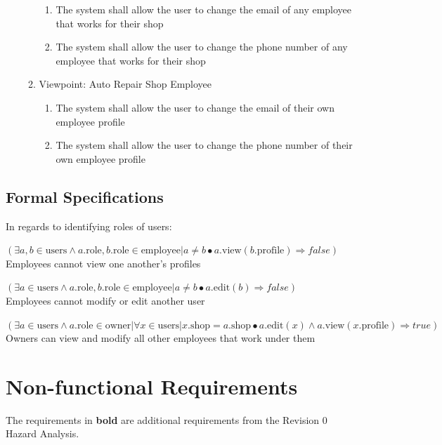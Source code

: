 \documentclass[12pt]{article}
\begin{document}
\begin{enumerate}[resume*=business_events]
\begin{enumerate}[VP\arabic*.]
\begin{enumerate}
			            \item The system shall allow the user to change the email of any employee that works for their shop
			            \item The system shall allow the user to change the phone number of any employee that works for their
			                  shop
		            \end{enumerate}
		      \item Viewpoint: Auto Repair Shop Employee
		            \begin{enumerate}
			            \item The system shall allow the user to change the email of their own employee profile
			            \item The system shall allow the user to change the phone number of their own employee profile
		            \end{enumerate}
	      \end{enumerate}
\end{enumerate}

\subsection{Formal Specifications}
In regards to identifying roles of users:

$(\exists a, b \in \text{users} \wedge a.\text{role},
	b.\text{role} \in \text{employee} | a \neq b \bullet a.\text{view}(b.\text{profile}) \Rightarrow
	false)$\\
Employees cannot view one another's profiles

$(\exists a \in \text{users} \wedge a.\text{role}, b.\text{role} \in \text{employee} | a \neq b \bullet a.\text{edit}(b) \Rightarrow false)$\\
Employees cannot modify or edit another user

$(\exists a \in \text{users} \wedge a.\text{role} \in \text{owner} | \forall x \in \text{users} | x.\text{shop} = a.\text{shop} \bullet a.\text{edit}(x) \wedge a.\text{view}(x.\text{profile}) \Rightarrow true)$\\
Owners can view and modify all other employees that work under them

\section{Non-functional Requirements}
The requirements in \textbf{bold} are additional requirements from the Revision 0 Hazard Analysis.
\end{document}
